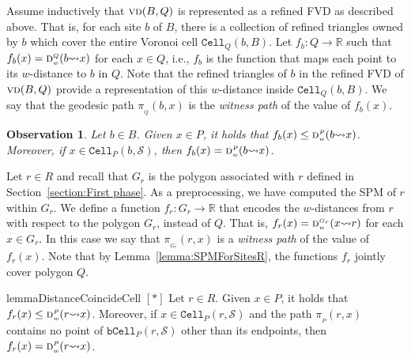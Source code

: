 \documentclass[a4paper,UKenglish]{socg-lipics-v2018}
\newtheorem{observation}[theorem]{Observation}
\newcommand{\s}{\mathcal S}
\newcommand{\dd}[3][P]{\ensuremath{\textsc{d}_{\scriptscriptstyle w}^{\scriptscriptstyle #1}(#2 {\leadsto} #3)}}
\newcommand{\p}[3][P]{\ensuremath{\pi_{_{#1}}(#2, #3)}}
\newcommand{\funnel}[2][P]{\ensuremath{\mathtt{Funnel}_{\scriptscriptstyle #1}(#2)}}
\newcommand{\cell}[2][P]{\ensuremath{\mathtt{Cell}_{\scriptscriptstyle #1}(#2)}}
\newcommand{\bcell}[2][P]{\ensuremath{\mathtt{bCell}_{\scriptscriptstyle #1}(#2)}}
\newcommand{\vd}[2][P]{\textsc{vd}(#2, #1)}
\begin{document}
Assume inductively that $\vd[Q]{B}$ is represented as a refined FVD as described above.
That is, for each site $b$ of $B$, there is a collection of refined triangles owned by $b$ which cover the entire Voronoi cell $\cell[Q]{b, B}$. 
Let $f_b:Q \to \mathbb{R}$ such that $f_b(x) = \dd[Q]{b}{x}$ for each $x\in Q$, i.e., $f_b$ is the function that maps each point to its $w$-distance to $b$ in $Q$. 
Note that the refined triangles of $b$ in the refined FVD of $\vd[Q]{B}$ provide a representation of this $w$-distance inside $\cell[Q]{b, B}$.
We say that the geodesic path $\p[Q]{b}{x}$ is the \emph{witness path} of the value of $f_b(x)$.

\begin{observation}\label{obs: f_s and distance coincide in cell}
Let $b\in B$.
Given $x\in P$, it holds that $f_b(x) \leq \dd{b}{x}$. Moreover, if $x\in \cell{b, \s}$, then $f_b(x) = \dd{b}{x}$. 
\end{observation}

Let $r\in R$ and recall that $G_r$ is the polygon associated with $r$ defined in Section~\ref{section:First phase}. 
As a preprocessing, we have computed the SPM of $r$ within $G_r$.
We define a function $f_r:G_r\to \mathbb{R}$ that encodes the $w$-distances from $r$ with respect to the polygon $G_r$, instead of $Q$. 
That is, $f_r(x) = \dd[G_r]{x}{r}$ for each $x\in G_r$.
In this case we say that $\p[G_r]{r}{x}$ is a \emph{witness path} of the value of $f_r(x)$. 
Note that by Lemma~\ref{lemma:SPMForSitesR}, the functions $f_r$ jointly cover polygon $Q$. 

\begin{restatable}{lemma}{DistanceCoincideCell}\label{lemma: f_r and distance coincide in cell}
\hyperref[ProofDistanceCoincideCell]{$[*]$}
Let $r\in R$.
Given $x\in P$, it holds that $f_r(x) \leq \dd{r}{x}$. Moreover, if $x\in \cell{r, \s}$ and the path $\p{r}{x}$ contains no point of $\bcell{r, \s}$ other than its endpoints, then $f_r(x) = \dd{r}{x}$. 
\end{restatable}
\newcommand{\ProofDistanceCoincideCell}{
\DistanceCoincideCell*
\begin{proof}\label{ProofDistanceCoincideCell}
\hyperref[lemma: f_r and distance coincide in cell]{$\hookleftarrow$}
By Lemma~\ref{lemma:Voronoi cell in funnel}, we know that if $x\in \cell{r,\s}$, then  $x$ belongs to $\funnel{r, \s}$.
Moreover, since $\funnel{r, \s}$ is contained in $G_r$, we know that 
\[ f_r(x) = \dd[G_r]{r}{x} \leq \dd[\funnel{r, \s}]{r}{x} = \dd{r}{x}.\]

If $\p{r}{x}$ contains no point of $\bcell{r, \s}$, then we claim that $\p{r}{x} = \p[G_r]{r}{x}$. 
If this claim is true, then clearly $f_r(x) = \dd[G_r]{r}{x} = \dd{r}{x}$ proving our result.
To prove our claim, notice that path $\p{r}{x}$ is contained in $\funnel{r, \s}$. Moreover, because this path contains no point of $\bcell{r, \s}$ other than its endpoints, then all reflex vertices along it must belong to the walls of $\funnel{r, \s}$. However, all these reflex vertices are also part of $G_r$. Thus, since $\funnel{r, \s}\subseteq G_r$, we conclude that $\p{r}{x} = \p[G_r]{r}{x}$ proving our claim.  
\end{proof}
}
\end{document}
